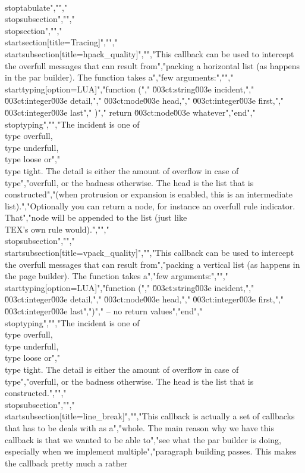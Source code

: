 \\stoptabulate","","\\stopsubsection","","\\stopsection","","\\startsection[title=Tracing]","","\\startsubsection[title=hpack_quality]","","This callback can be used to intercept the overfull messages that can result from","packing a horizontal list (as happens in the par builder). The function takes a","few arguments:","","\\starttyping[option=LUA]","function (","    \u003ct:string\u003e  incident,","    \u003ct:integer\u003e detail,","    \u003ct:node\u003e    head,","    \u003ct:integer\u003e first,","    \u003ct:integer\u003e last"," )","    return \u003ct:node\u003e whatever","end","\\stoptyping","","The incident is one of \\type {overfull}, \\type {underfull}, \\type {loose} or","\\type {tight}. The detail is either the amount of overflow in case of \\type","{overfull}, or the badness otherwise. The head is the list that is constructed","(when protrusion or expansion is enabled, this is an intermediate list).","Optionally you can return a node, for instance an overfull rule indicator. That","node will be appended to the list (just like \\TEX's own rule would).","","\\stopsubsection","","\\startsubsection[title=vpack_quality]","","This callback can be used to intercept the overfull messages that can result from","packing a vertical list (as happens in the page builder). The function takes a","few arguments:","","\\starttyping[option=LUA]","function (","    \u003ct:string\u003e  incident,","    \u003ct:integer\u003e detail,","    \u003ct:node\u003e    head,","    \u003ct:integer\u003e first,","    \u003ct:integer\u003e last",")","    -- no return values","end","\\stoptyping","","The incident is one of \\type {overfull}, \\type {underfull}, \\type {loose} or","\\type {tight}. The detail is either the amount of overflow in case of \\type","{overfull}, or the badness otherwise. The head is the list that is constructed.","","\\stopsubsection","","\\startsubsection[title=line_break]","","This callback is actually a set of callbacks that has to be deals with as a","whole. The main reason why we have this callback is that we wanted to be able to","see what the par builder is doing, especially when we implement multiple","paragraph building passes. This makes the callback pretty much a rather 